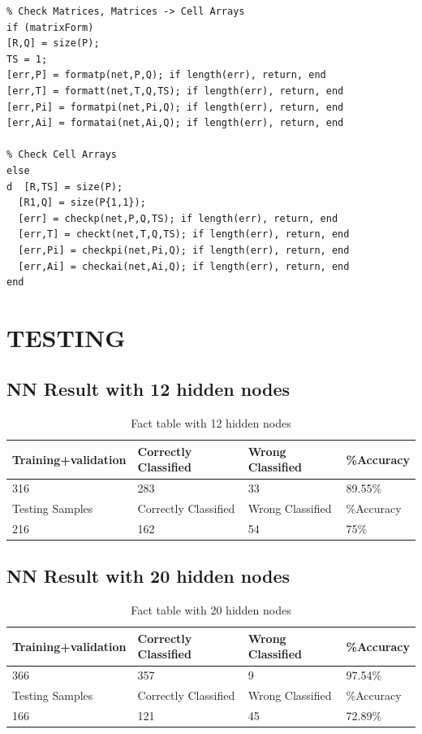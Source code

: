 \documentclass[a4paper,14pt,onecolumn]{article}
\begin{document}
\begin{verbatim}
% Check Matrices, Matrices -> Cell Arrays
if (matrixForm)
[R,Q] = size(P);
TS = 1;
[err,P] = formatp(net,P,Q); if length(err), return, end
[err,T] = formatt(net,T,Q,TS); if length(err), return, end
[err,Pi] = formatpi(net,Pi,Q); if length(err), return, end
[err,Ai] = formatai(net,Ai,Q); if length(err), return, end
  
% Check Cell Arrays
else
d  [R,TS] = size(P);
  [R1,Q] = size(P{1,1});
  [err] = checkp(net,P,Q,TS); if length(err), return, end
  [err,T] = checkt(net,T,Q,TS); if length(err), return, end
  [err,Pi] = checkpi(net,Pi,Q); if length(err), return, end
  [err,Ai] = checkai(net,Ai,Q); if length(err), return, end
end
\end{verbatim}

\section{TESTING}
\subsection{NN Result with 12 hidden nodes}
\begin{table}[hbp]
 \begin{center}
    \begin{tabular}{ | p{4cm} | p{4cm} | p{4cm} | p{3cm} |}
    \hline
     Training+validation & Correctly Classified & Wrong Classified	& \%Accuracy  \\ \hline
316  &	283 &  33 & 	89.55\% \\ \hline
Testing Samples & 	Correctly Classified	 &  Wrong Classified	&  \%Accuracy\\ \hline
216	&  162 &  	54	 &  75\%\\      \hline
       \end{tabular}
   \caption{Fact table with 12 hidden nodes}
\end{center}
\end{table} 

\subsection{NN Result with 20 hidden nodes}
\begin{table}[hbp]
 \begin{center}
    \begin{tabular}{ | p{4cm} | p{4cm} | p{4cm} | p{3cm} |}
    \hline
     Training+validation & Correctly Classified & Wrong Classified	& \%Accuracy  \\ \hline
366	& 357 &	9	& 97.54\% \\ \hline
Testing Samples & 	Correctly Classified	 &  Wrong Classified	&  \%Accuracy\\ \hline
166	& 121 & 45	 & 72.89\%\\  \hline
       \end{tabular}
   \caption{Fact table with 20 hidden nodes}
\end{center}
\end{table} 
\end{document}
